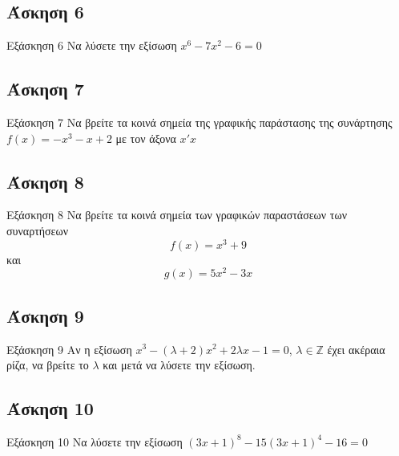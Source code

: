 \documentclass[greek]{beamer}
\begin{document}
\subsection{Άσκηση 6}
\begin{frame}[label=Άσκηση6,t]{Εξάσκηση 6}
 Να λύσετε την εξίσωση $x^6-7x^2-6=0$

\end{frame}

\subsection{Άσκηση 7}
\begin{frame}[label=Άσκηση7,t]{Εξάσκηση 7}
 Να βρείτε τα κοινά σημεία της γραφικής παράστασης της συνάρτησης $f(x)=-x^3-x+2$ με τον άξονα $x'x$

\end{frame}

\subsection{Άσκηση 8}
\begin{frame}[label=Άσκηση8,t]{Εξάσκηση 8}
 Να βρείτε τα κοινά σημεία των γραφικών παραστάσεων των συναρτήσεων $$f(x)=x^3+9$$ και $$g(x)=5x^2-3x$$

\end{frame}

\subsection{Άσκηση 9}
\begin{frame}[label=Άσκηση9,t]{Εξάσκηση 9}
 Αν η εξίσωση $x^3-(λ+2)x^2+2λx-1=0$, $λ\in\mathbb{Z}$ έχει ακέραια ρίζα, να βρείτε το $λ$ και μετά να λύσετε την εξίσωση.

\end{frame}

\subsection{Άσκηση 10}
\begin{frame}[label=Άσκηση10,t]{Εξάσκηση 10}
Να λύσετε την εξίσωση $(3x+1)^8-15(3x+1)^4-16=0$

\end{frame}
\end{document}
